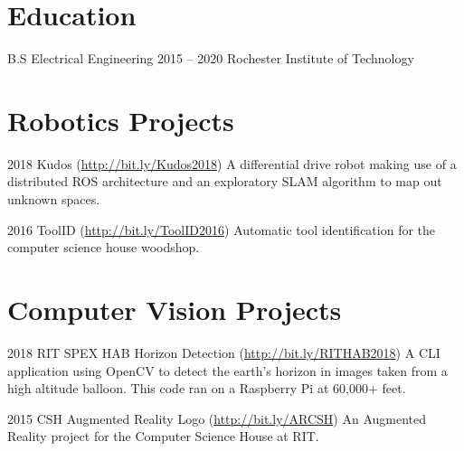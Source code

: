\documentclass{tccv}
\begin{document}
\section{Education}

\begin{yearlist}

\item[B.S Electrical Engineering]{2015 -- 2020}
     {Rochester Institute of Technology}
     
\end{yearlist}


\section{Robotics Projects}

\begin{yearlist}

\item{2018}
     {Kudos (\href{http://bit.ly/Kudos2018}{http://bit.ly/Kudos2018})}
     {A differential drive robot making use of a distributed ROS architecture and an exploratory SLAM algorithm to map out unknown spaces.}

\item{2016}
     {ToolID (\href{http://bit.ly/ToolID2016}{http://bit.ly/ToolID2016})}
     {Automatic tool identification for the computer science house woodshop. }
     
\end{yearlist}


\section{Computer Vision Projects}

\begin{yearlist}

\item{2018}
     {RIT SPEX HAB Horizon Detection (\href{http://bit.ly/RITHAB2018}
     {http://bit.ly/RITHAB2018})}
     {A CLI application using OpenCV to detect the earth's horizon in images taken from a high altitude balloon. This code ran on a Raspberry Pi at 60,000+ feet.}
    
\item{2015}
     {CSH Augmented Reality Logo (\href{http://bit.ly/ARCSH}
     {http://bit.ly/ARCSH})}
     {An Augmented Reality project for the Computer Science House at RIT.}

\end{yearlist}
\end{document}

